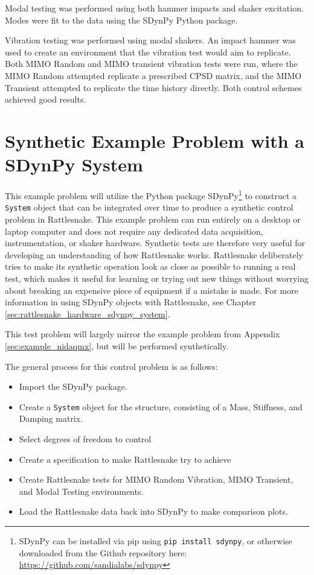 \documentclass[pdf,12pt,report]{SANDreport}
\newcommand{\inlineCode}{\lstinline[basicstyle=\bfseries\ttfamily]}
\begin{document}
{{{{    Modal testing was performed using both hammer impacts and shaker excitation.  Modes were fit to the data using the SDynPy Python package.
    
    Vibration testing was performed using modal shakers.  An impact hammer was used to create an environment that the vibration test would aim to replicate.  Both \ac{MIMO} Random and \ac{MIMO} transient vibration tests were run, where the \ac{MIMO} Random attempted replicate a prescribed \ac{CPSD} matrix, and the \ac{MIMO} Transient attempted to replicate the time history directly.  Both control schemes achieved good results.
    
    \chapter{Synthetic Example Problem with a SDynPy System}\label{sec:example_sdynpy}
    This example problem will utilize the Python package SDynPy\footnote{SDynPy can be installed via pip using \inlineCode{pip install sdynpy}, or otherwise downloaded from the Github repository here: \url{https://github.com/sandialabs/sdynpy}} to construct a \inlineCode{System} object that can be integrated over time to produce a synthetic control problem in Rattlesnake.  This example problem can run entirely on a desktop or laptop computer and does not require any dedicated data acquisition, instrumentation, or shaker hardware.  Synthetic tests are therefore very useful for developing an understanding of how Rattlesnake works.  Rattlesnake deliberately tries to make its synthetic operation look as close as possible to running a real test, which makes it useful for learning or trying out new things without worrying about breaking an expensive piece of equipment if a mistake is made.  For more information in using SDynPy objects with Rattlesnake, see Chapter \ref{sec:rattlesnake_hardware_sdynpy_system}.
    
    This test problem will largely mirror the example problem from Appendix \ref{sec:example_nidaqmx}, but will be performed synthetically.
    
    The general process for this control problem is as follows:
    \begin{itemize}
        \item Import the SDynPy package.
        \item Create a \inlineCode{System} object for the structure, consisting of a Mass, Stiffness, and Damping matrix.
        \item Select degrees of freedom to control
        \item Create a specification to make Rattlesnake try to achieve
        \item Create Rattlesnake tests for \Ac{MIMO} Random Vibration, \Ac{MIMO} Transient, and Modal Testing environments.
        \item Load the Rattlesnake data back into SDynPy to make comparison plots.
    \end{itemize}
    
}}}}
\end{document}
